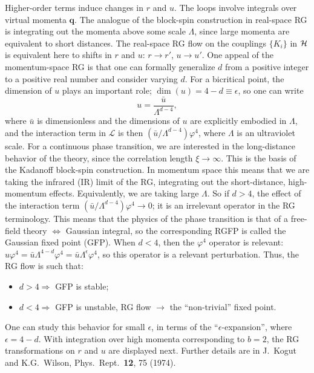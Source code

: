 Higher-order terms induce changes in $r$ and $u$. The loops involve integrals over virtual momenta $\mathbf q$.
The analogue of the block-spin construction in real-space RG is integrating out the momenta above some scale
$\Lambda$, since large momenta are equivalent to short distances. The real-space RG flow on the couplings
$\{K_i\}$ in $\mathcal{H}$ is equivalent here to shifts in $r$ and $u$: $r\to r'$, $u\to u'$. One appeal of the
momentum-space RG is that one can formally generalize $d$ from a positive integer to a positive real number
and consider varying $d$. For a bicritical point, the dimension of $u$ plays an important role;
$\dim(u) = 4-d\equiv\epsilon$, so one can write
\begin{equation}
  u = \frac{\bar u}{\Lambda^{d-4}},
\end{equation}
where $\bar u$ is dimensionless and the dimensions of $u$ are explicitly embodied in $\Lambda$, and the
interaction term in $\mathcal L$ is then $(\bar u/\Lambda^{d-4})\varphi^4$, where $\Lambda$ is an ultraviolet
scale. For a continuous phase transition, we are interested in the long-distance behavior of the theory,
since the correlation length $\xi\to\infty$. This is the basis of the Kadanoff block-spin construction. In
momentum space this means that we are taking the infrared (IR) limit of the RG, integrating out the
short-distance, high-momentum effects. Equivalently, we are taking large $\Lambda$. So if $d>4$, the effect of
the interaction term $(\bar u/\Lambda^{d-4})\varphi^4\to 0$; it is an irrelevant operator in the RG
terminology. This means that the physics of the phase transition is that of a free-field theory
$\Leftrightarrow$ Gaussian integral, so the corresponding RGFP is called the Gaussian fixed point (GFP).
When $d<4$, then the $\varphi^4$ operator is relevant:
$u\varphi^4 = \bar u\Lambda^{4-d}\varphi^4 = \bar u\Lambda^\epsilon\varphi^4$, so this operator is a relevant
perturbation. Thus, the RG flow is such that:
\begin{itemize}
  \item $d>4\Rightarrow$ GFP is stable;
  \item $d<4\Rightarrow$ GFP is unstable, RG flow $\to$ the ``non-trivial'' fixed point.
\end{itemize}
One can study this behavior for small $\epsilon$, in terms of the ``$\epsilon$-expansion'', where
$\epsilon = 4-d$. With integration over high momenta corresponding to $b = 2$, the RG transformations on $r$ and
$u$ are displayed next. Further details are in J.~Kogut and K.G.~Wilson, Phys.\ Rept.\ \textbf{12}, 75 (1974).

